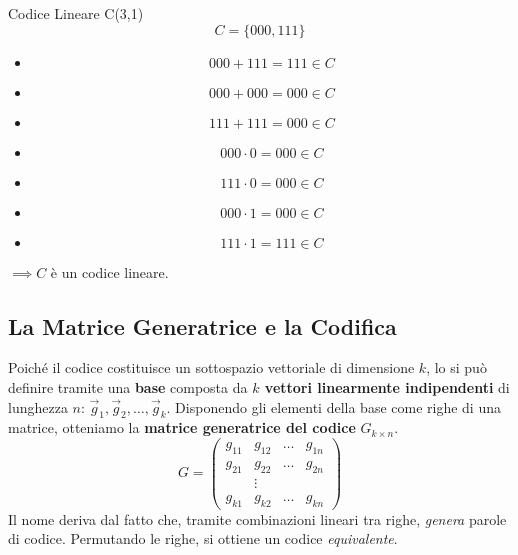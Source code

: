 \begin{esempio}{Codice Lineare C(3,1)}
\[C=\{000,111\}\]
\begin{itemize}
\item \[000+111=111 \in C\]
\item \[000+000=000 \in C\]
\item \[111+111=000 \in C\]
\item \[000 \cdot 0 = 000 \in C \]
\item \[111 \cdot 0 = 000 \in C \]
\item \[000 \cdot 1 = 000 \in C \]
\item \[111 \cdot 1 = 111 \in C \]
\end{itemize}
$\implies C$ è un codice lineare.
\end{esempio}





\subsection{La Matrice Generatrice e la Codifica}
Poiché il codice costituisce un sottospazio vettoriale di dimensione $k$, lo si può definire tramite una \textbf{base} composta da \textbf{$k$ vettori linearmente indipendenti} di lunghezza $n$: $\vec{g}_1, \vec{g}_2, \dots, \vec{g}_k$.
Disponendo gli elementi della base come righe di una matrice, otteniamo la \textbf{matrice generatrice del codice} $G_{k \times n}$.
\begin{equation*}
G = 
\begin{pmatrix}
    g_{11} & g_{12} & \dots  & g_{1n} \\
    g_{21} & g_{22} & \dots  & g_{2n} \\
           & \vdots &        &        \\
    g_{k1} & g_{k2} & \dots  & g_{kn}
\end{pmatrix}
\end{equation*}
Il nome deriva dal fatto che, tramite combinazioni lineari tra righe, \textit{genera} parole di codice.
Permutando le righe, si ottiene un codice \textit{equivalente}.

